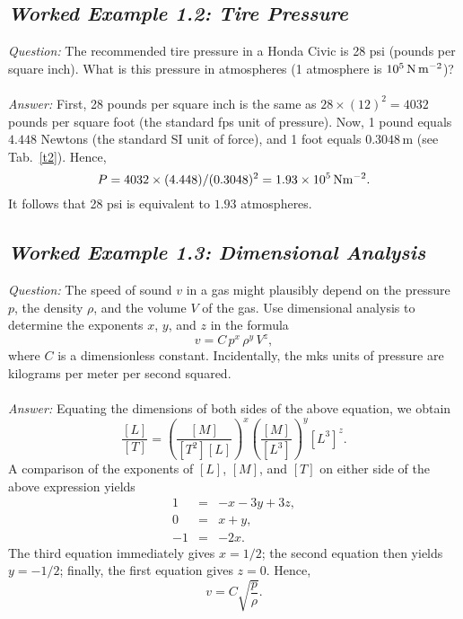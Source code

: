 \subsection*{\em Worked Example 1.2: Tire Pressure}
{\em Question:} The recommended tire pressure in a Honda Civic is 28 psi (pounds per
square inch). What is this pressure in atmospheres (1 atmosphere is
$10^5\,{\rm N}\,{\rm m}^{-2}$)?\\
~\\
{\em Answer:} First, 28 pounds per
square inch is the same as $28\times (12)^2 = 4032$ pounds per square
foot (the standard fps unit of pressure).
Now, 1 pound equals $4.448$ Newtons (the standard SI unit of force), and
1 foot equals $0.3048$\,m (see Tab.~\ref{t2}). Hence,
$$
P = 4032\times (4.448) / (0.3048)^2 = 1.93\times 10^5\,{\rm N}{\rm m}^{-2}.
$$
It follows that 28 psi is equivalent to $1.93$ atmospheres.


\subsection*{\em Worked Example 1.3: Dimensional Analysis}
{\em Question:} The speed of sound $v$  in a gas might plausibly depend on
the pressure $p$, the density $\rho$, and the volume $V$ of the gas. Use
dimensional analysis to determine the exponents $x$, $y$, and $z$ in the
formula
$$
v = C\,p^x\,\rho^y\,V^z,
$$
where $C$ is a dimensionless constant. Incidentally, the mks units
of pressure are kilograms per meter per second squared. \\
~\\
{\em Answer:} Equating the dimensions of both sides of the above equation, we
obtain
$$
\frac{[L]}{[T]} = \left(\frac{[M]}{[T^2][L]}\right)^x\left(
\frac{[M]}{[L^3]}\right)^y [L^3]^z.
$$
A comparison of the exponents of $[L]$, $[M]$, and $[T]$ on either side of the
above expression yields
\begin{eqnarray}
1 &=& -x -3 y+ 3z,\nonumber\\
0 &=& x + y,\nonumber\\
-1&=& -2 x.\nonumber
\end{eqnarray}
The third equation immediately gives $x=1/2$; the second equation then yields $y=-1/2$; finally,
the first equation gives $z=0$. Hence,
$$
v = C \sqrt{\frac{p}{\rho}}.
$$
